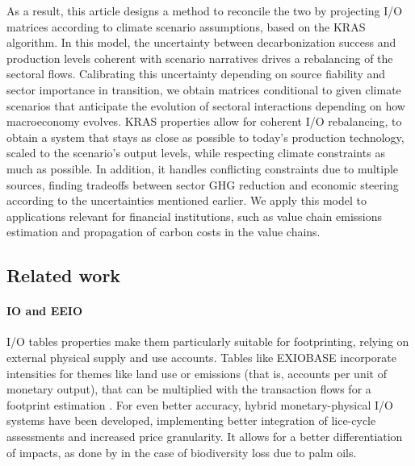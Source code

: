 \documentclass[11pt,a4paper]{article}
\begin{document}
As a result, this article designs a method to reconcile the two by projecting I/O matrices according to climate scenario assumptions, based on the KRAS algorithm. In this model, the uncertainty between decarbonization success and production levels coherent with scenario narratives drives a rebalancing of the sectoral flows. Calibrating this uncertainty depending on source fiability and sector importance in transition, we obtain matrices conditional to given climate scenarios that anticipate the evolution of sectoral interactions depending on how macroeconomy evolves. KRAS properties allow for coherent I/O rebalancing, to obtain a system that stays as close as possible to today's production technology, scaled to the scenario's output levels, while respecting climate constraints as much as possible. In addition, it handles conflicting constraints due to multiple sources, finding tradeoffs between sector GHG reduction and economic steering according to the uncertainties mentioned earlier. We apply this model to applications relevant for financial institutions, such as value chain emissions estimation and propagation of carbon costs in the value chains.


\subsection{Related work}
\label{sec:related}

\paragraph{IO and EEIO}
\label{sub:eeio}
I/O tables properties make them particularly suitable for footprinting, relying on external physical supply and use accounts. Tables like EXIOBASE incorporate intensities for themes like land use or emissions (that is, accounts per unit of monetary output), that can be multiplied with the transaction flows for a footprint estimation \citep{stadler2018exiobase}. For even better accuracy, hybrid monetary-physical I/O systems have been developed, implementing better integration of lice-cycle assessments and increased price granularity. It allows for a better differentiation of impacts, as done by \cite{tobben2018novel} in the case of biodiversity loss due to palm oils.
\end{document}
